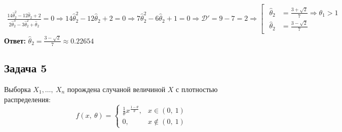 \documentclass[12pt, a4paper]{article}
\begin{document}
\begin{equation*}
    \begin{aligned}
        \frac{14\hat\theta_2^2 - 12\hat\theta_2 + 2}{2\hat\theta_2^3 - 3\hat\theta_2^2 + \hat\theta_2} = 0 \Rightarrow {14\hat\theta_2^2 - 12\hat\theta_2 + 2} = 0 \Rightarrow 7\hat\theta_2^2 - 6\hat\theta_2 + 1 = 0 \Rightarrow \mathcal{D}' = 9 - 7 = 2\Rightarrow \left[\begin{gathered}
                                                                                                                                                                                                                                                                                 \begin{aligned}
                \hat\theta_2 & = \frac{3 + \sqrt{2}}{7} \Rightarrow \theta_1 > 1 \\
                \hat\theta_2 & = \frac{3 - \sqrt{2}}{7}
            \end{aligned}
                                                                                                                                                                                                                                                                             \end{gathered}\right.
    \end{aligned}
\end{equation*}
\textbf{Ответ:} $\hat \theta_2 = \frac{3 - \sqrt{2}}{7} \approx 0.22654$
\subsection*{Задача 5}
Выборка $X_1,\dots,\ X_n$ порождена случаной величиной $X$ с плотностью распределения:
\[f(x,\ \theta) = \begin{cases}
        \frac{1}{\theta}x^{\frac{1 - \theta}{\theta}}, & x\in (0,\ 1)    \\
        0,\                                            & x\notin (0,\ 1)
    \end{cases}\]
\end{document}
